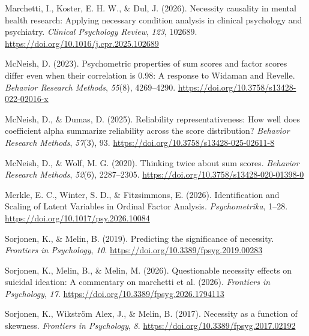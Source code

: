 \documentclass[
  man,
  longtable,
  nolmodern,
  notxfonts,
  notimes,
  colorlinks=true,linkcolor=blue,citecolor=blue,urlcolor=blue]{apa7}
\newlength{\cslhangindent}
\newenvironment{CSLReferences}[2] %
 {\begin{list}{}{%
  \setlength{\itemindent}{0pt}
  \setlength{\leftmargin}{0pt}
  \setlength{\parsep}{0pt}
  \ifodd #1
   \setlength{\leftmargin}{\cslhangindent}
   \setlength{\itemindent}{-1\cslhangindent}
  \fi
  \setlength{\itemsep}{#2\baselineskip}}}
 {\end{list}}
\begin{document}
\begin{CSLReferences}{1}{0}
Marchetti, I., Koster, E. H. W., \& Dul, J. (2026). Necessity causality
in mental health research: Applying necessary condition analysis in
clinical psychology and psychiatry. \emph{Clinical Psychology Review},
\emph{123}, 102689. \url{https://doi.org/10.1016/j.cpr.2025.102689}

McNeish, D. (2023). Psychometric properties of sum scores and factor
scores differ even when their correlation is 0.98: A response to Widaman
and Revelle. \emph{Behavior Research Methods}, \emph{55}(8), 4269--4290.
\url{https://doi.org/10.3758/s13428-022-02016-x}

McNeish, D., \& Dumas, D. (2025). Reliability representativeness: How
well does coefficient alpha summarize reliability across the score
distribution? \emph{Behavior Research Methods}, \emph{57}(3), 93.
\url{https://doi.org/10.3758/s13428-025-02611-8}

McNeish, D., \& Wolf, M. G. (2020). Thinking twice about sum scores.
\emph{Behavior Research Methods}, \emph{52}(6), 2287--2305.
\url{https://doi.org/10.3758/s13428-020-01398-0}

Merkle, E. C., Winter, S. D., \& Fitzsimmons, E. (2026). Identification
and Scaling of Latent Variables in Ordinal Factor Analysis.
\emph{Psychometrika}, 1--28.
\url{https://doi.org/10.1017/psy.2026.10084}

Sorjonen, K., \& Melin, B. (2019). Predicting the significance of
necessity. \emph{Frontiers in Psychology}, \emph{10}.
\url{https://doi.org/10.3389/fpsyg.2019.00283}

Sorjonen, K., Melin, B., \& Melin, M. (2026). Questionable necessity
effects on suicidal ideation: A commentary on marchetti et al. (2026).
\emph{Frontiers in Psychology}, \emph{17}.
\url{https://doi.org/10.3389/fpsyg.2026.1794113}

Sorjonen, K., Wikström Alex, J., \& Melin, B. (2017). Necessity as a
function of skewness. \emph{Frontiers in Psychology}, \emph{8}.
\url{https://doi.org/10.3389/fpsyg.2017.02192}


\end{CSLReferences}
\end{document}
